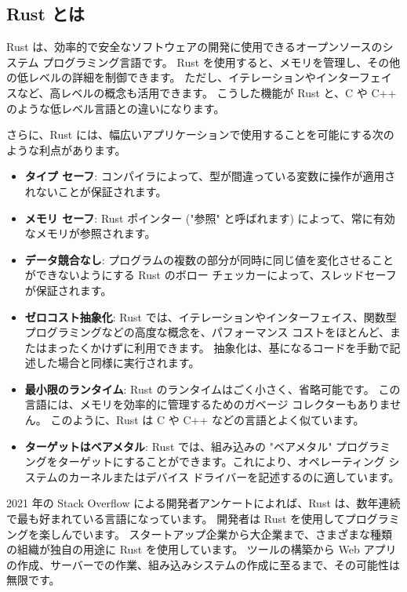 \subsection{Rust とは}

Rust は、効率的で安全なソフトウェアの開発に使用できるオープンソースのシステム プログラミング言語です。 Rust を使用すると、メモリを管理し、その他の低レベルの詳細を制御できます。 ただし、イテレーションやインターフェイスなど、高レベルの概念も活用できます。 こうした機能が Rust と、C や C++ のような低レベル言語との違いになります。

さらに、Rust には、幅広いアプリケーションで使用することを可能にする次のような利点があります。

\begin{itemize}
\item \textbf{タイプ セーフ}: コンパイラによって、型が間違っている変数に操作が適用されないことが保証されます。
\item \textbf{メモリ セーフ}: Rust ポインター ("参照" と呼ばれます) によって、常に有効なメモリが参照されます。
\item \textbf{データ競合なし}: プログラムの複数の部分が同時に同じ値を変化させることができないようにする Rust のボロー チェッカーによって、スレッドセーフが保証されます。
\item \textbf{ゼロコスト抽象化}: Rust では、イテレーションやインターフェイス、関数型プログラミングなどの高度な概念を、パフォーマンス コストをほとんど、またはまったくかけずに利用できます。 抽象化は、基になるコードを手動で記述した場合と同様に実行されます。
\item \textbf{最小限のランタイム}: Rust のランタイムはごく小さく、省略可能です。 この言語には、メモリを効率的に管理するためのガベージ コレクターもありません。 このように、Rust は C や C++ などの言語とよく似ています。
\item \textbf{ターゲットはベアメタル}: Rust では、組み込みの "ベアメタル" プログラミングをターゲットにすることができます。これにより、オペレーティング システムのカーネルまたはデバイス ドライバーを記述するのに適しています。
\end{itemize}

2021 年の Stack Overflow による開発者アンケートによれば、Rust は、数年連続で最も好まれている言語になっています。 開発者は Rust を使用してプログラミングを楽しんでいます。 スタートアップ企業から大企業まで、さまざまな種類の組織が独自の用途に Rust を使用しています。 ツールの構築から Web アプリの作成、サーバーでの作業、組み込みシステムの作成に至るまで、その可能性は無限です。